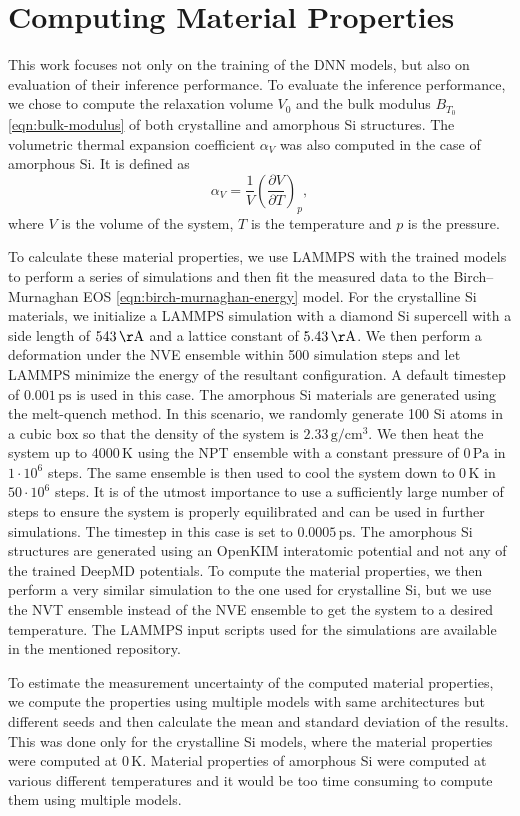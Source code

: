 \section{Computing Material Properties}

This work focuses not only on the training of the DNN models, but also on
evaluation of their inference performance. To evaluate the inference
performance, we chose to compute the relaxation volume $V_0$ and the bulk
modulus $B_{T_0}$ \eqref{eqn:bulk-modulus} of both crystalline and amorphous
Si structures. The volumetric thermal expansion coefficient $\alpha_V$ was
also computed in the case of amorphous Si. It is defined as
\begin{equation}
  \alpha_V = \frac{1}{V} \left( \frac{\partial V}{\partial T} \right)_p,
\end{equation}
where $V$ is the volume of the system, $T$ is the temperature and $p$ is the
pressure.

To calculate these material properties, we use LAMMPS with the trained models
to perform a series of simulations and then fit the measured data to the
Birch--Murnaghan EOS \eqref{eqn:birch-murnaghan-energy} model. For the
crystalline Si materials, we initialize a LAMMPS simulation with a diamond Si
supercell with a side length of $543 \, \mathrm{\AA}$ and a lattice constant
of $5.43 \, \mathrm{\AA}$. We then perform a deformation under the NVE
ensemble within 500 simulation steps and let LAMMPS minimize the energy of the
resultant configuration. A default timestep of $0.001 \, \mathrm{ps}$ is used
in this case. The amorphous Si materials are generated using the melt-quench
method. In this scenario, we randomly generate 100 Si atoms in a cubic box so
that the density of the system is $2.33 \, \mathrm{g/cm^3}$. We then heat the
system up to $4000 \, \mathrm{K}$ using the NPT ensemble with a constant
pressure of $0 \, \mathrm{Pa}$ in $1 \cdot 10^{6}$ steps. The same ensemble is
then used to cool the system down to $0 \, \mathrm{K}$ in $50 \cdot 10^{6}$
steps. It is of the utmost importance to use a sufficiently large number of
steps to ensure the system is properly equilibrated and can be used in further
simulations. The timestep in this case is set to $0.0005 \, \mathrm{ps}$. The
amorphous Si structures are generated using an OpenKIM interatomic potential
and not any of the trained DeepMD potentials. To compute the material
properties, we then perform a very similar simulation to the one used for
crystalline Si, but we use the NVT ensemble instead of the NVE ensemble to get
the system to a desired temperature. The LAMMPS input scripts used for the
simulations are available in the mentioned repository.

To estimate the measurement uncertainty of the computed material properties,
we compute the properties using multiple models with same architectures but
different seeds and then calculate the mean and standard deviation of the
results. This was done only for the crystalline Si models, where the material
properties were computed at $0 \, \mathrm{K}$. Material properties of
amorphous Si were computed at various different temperatures and it would be
too time consuming to compute them using multiple models.
